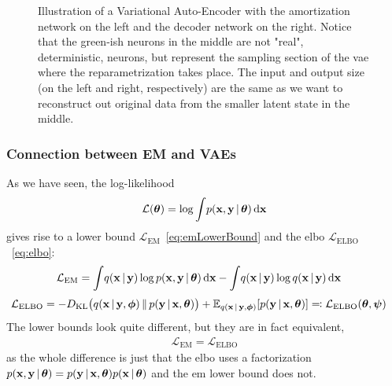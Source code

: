 		\begin{figure}
			\centering
			\tikzVariationalAutoEncoder
			\caption{Illustration of a Variational Auto-Encoder with the amortization network on the left and the decoder network on the right. Notice that the green-ish neurons in the middle are not "real", deterministic, neurons, but represent the sampling section of the \ac{vae} where the reparametrization takes place. The input and output size (on the left and right, respectively) are the same as we want to reconstruct out original data from the smaller latent state in the middle.}
			\label{fig:vae}
		\end{figure}

		\subsubsection{Connection between EM and VAEs}
			As we have seen, the log-likelihood
			\begin{align*}
				\mathcal{L}(\boldsymbol{\mathrm{\theta}}) = \log \int\! p(\boldsymbol{\mathrm{x}}, \boldsymbol{\mathrm{y}} \,\vert\, \boldsymbol{\mathrm{\theta}}) \dd{\boldsymbol{\mathrm{x}}}
			\end{align*}
			gives rise to a lower bound \( \mathcal{L}_\mathrm{EM} \)~\eqref{eq:emLowerBound} and the \ac{elbo} \( \mathcal{L}_\mathrm{ELBO} \)~\eqref{eq:elbo}:
			\begin{align*}
				\mathcal{L}_\mathrm{EM}
					&= \int\! q(\boldsymbol{\mathrm{x}} \,\vert\, \boldsymbol{\mathrm{y}}) \log p(\boldsymbol{\mathrm{x}}, \boldsymbol{\mathrm{y}} \,\vert\, \boldsymbol{\mathrm{\theta}}) \dd{\boldsymbol{\mathrm{x}}} - \int\! q(\boldsymbol{\mathrm{x}} \,\vert\, \boldsymbol{\mathrm{y}}) \log q(\boldsymbol{\mathrm{x}} \,\vert\, \boldsymbol{\mathrm{y}}) \dd{\boldsymbol{\mathrm{x}}}
			\end{align*}
			\begin{align*}
				\mathcal{L}_\mathrm{ELBO}
					&= -D_\mathrm{KL}\big( q(\boldsymbol{\mathrm{x}} \,\vert\, \boldsymbol{\mathrm{y}}, \boldsymbol{\mathrm{\phi}}) \,\Vert\, p(\boldsymbol{\mathrm{y}} \,\vert\, \boldsymbol{\mathrm{x}}, \boldsymbol{\mathrm{\theta}}) \big) + \mathbb{E}_{q(\boldsymbol{\mathrm{x}} \,\vert\, \boldsymbol{\mathrm{y}}, \boldsymbol{\mathrm{\phi}})}[p(\boldsymbol{\mathrm{y}} \,\vert\, \boldsymbol{\mathrm{x}}, \boldsymbol{\mathrm{\theta}})] \eqqcolon \mathcal{L}_\mathrm{ELBO}(\boldsymbol{\mathrm{\theta}}, \boldsymbol{\mathrm{\psi}})
			\end{align*}
			The lower bounds look quite different, but they are in fact equivalent,
			\begin{align*}
				\mathcal{L}_\mathrm{EM} = \mathcal{L}_\mathrm{ELBO}
			\end{align*}
			as the whole difference is just that the \ac{elbo} uses a factorization \( p(\boldsymbol{\mathrm{x}}, \boldsymbol{\mathrm{y}} \,\vert\, \boldsymbol{\mathrm{\theta}}) = p(\boldsymbol{\mathrm{y}} \,\vert\, \boldsymbol{\mathrm{x}}, \boldsymbol{\mathrm{\theta}}) p(\boldsymbol{\mathrm{x}} \,\vert\, \boldsymbol{\mathrm{\theta}}) \) and the \ac{em} lower bound does not.

